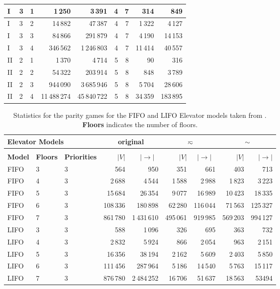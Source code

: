 \documentclass[a4paper]{llncs}
\renewcommand{\sb}{\sim}
\newcommand{\stut}{\eqsim}\newcommand{\semistut}{\sim_{\mathrm{semi-st}}}
\begin{document}
\begin{table}[!ht]
\begin{tabular}{lll||rr|rr|rr}
I &3 & 1 &   1\,250 & 3\,391 & 4 & 7 & 314 & 849 \\ \hline 
I &3 & 2 &   14\,882 & 47\,387 & 4 & 7 & 1\,322 & 4\,127 \\ \hline
I &3 & 3 &   84\,866 & 291\,879 & 4 & 7 & 4\,190 & 14\,153 \\ \hline 
I &3 & 4 &   346\,562 & 1\,246\,803 & 4 & 7 & 11\,414 & 40\,557 \\ \hline 
II&2 & 1  &  1\,370 & 4\,714 & 5 & 8 & 90 & 316 \\ \hline  
II&2 & 2  &  54\,322 & 203\,914 & 5 & 8 & 848 & 3\,789 \\ \hline 
II&2 & 3  &  944\,090 & 3\,685\,946 & 5 & 8 & 5\,704 & 28\,606 \\ \hline 
II&2 & 4  &  11\,488\,274 & 45\,840\,722 & 5 & 8 & 34\,359 & 183\,895 \\
\hline
\end{tabular}
 \end{table}

\begin{table}[!ht]
\caption{Statistics for the parity games for the FIFO and LIFO Elevator models
taken from \cite{FL:09}. \textbf{Floors} indicates the number of floors.}
\label{tab:sizes_pgsolver}
\vspace{-1em}
\setlength{\tabcolsep}{3.5pt}
\begin{tabular}{lll||rr|rr|rr}\\
\multicolumn{3}{l}{\textbf{Elevator Models}}   &
\multicolumn{2}{c}{\textbf{original}} & \multicolumn{2}{c}{$\stut$} & \multicolumn{2}{c}{$\sb$} \\
\hline
\hline
& & & \\
\textbf{Model} & \textbf{Floors} & \textbf{Priorities} & 
\textbf{$|V|$} & \textbf{$|{\to}|$~} & \textbf{$|V|$} & \textbf{$|{\to}|$~} & \textbf{$|V|$} & \textbf{$|{\to}|$} \\
\hline 
FIFO & 3 & 3 & 564 & 950 & 351 & 661 & 403 & 713 \\ \hline
FIFO & 4 & 3 & 2\,688 & 4\,544 & 1\,588 & 2\,988 & 1\,823 & 3\,223 \\\hline
FIFO & 5 & 3 & 15\,684 & 26\,354 & 9\,077 & 16\,989 & 10\,423 & 18\,335 
\\\hline
FIFO & 6 & 3 &  108\,336 & 180\,898 & 62\,280 & 116\,044 & 71\,563 & 125\,327 \\\hline
FIFO & 7 & 3 & 861\,780 & 1\,431\,610 & 495\,061 & 919\,985 & 569\,203 & 994\,127 \\\hline
LIFO & 3 & 3 & 588 & 1\,096 & 326 & 695 & 363 & 732 \\\hline
LIFO & 4 & 3 & 2\,832 & 5\,924 & 866 & 2\,054 & 963 & 2\,151 \\\hline
LIFO & 5 & 3 & 16\,356 & 38\,194 & 2\,162 & 5\,609 & 2\,403 & 5\,850 \\\hline
LIFO & 6 & 3 & 111\,456 & 287\,964 & 5\,186 & 14\,540 & 5\,763 & 15\,117 \\\hline
LIFO & 7 & 3 & 876\,780 & 2\,484\,252 & 16\,706 & 51\,637 & 18\,563 &
53494 \\\hline
\end{tabular}
\end{table}
\end{document}
